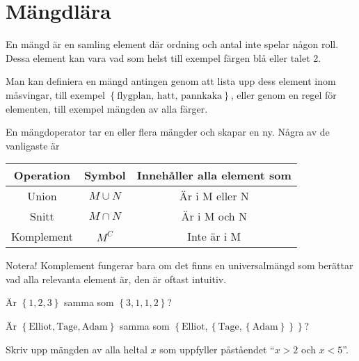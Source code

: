 \section{Mängdlära}

\begin{definition}[Mängd]
En mängd är en samling element där ordning och antal inte spelar någon roll. Dessa element kan vara vad som helst till exempel färgen blå eller talet 2.
\end{definition}

Man kan definiera en mängd antingen genom att lista upp dess element inom måsvingar, till exempel \(\left\{\text{flygplan, hatt, pannkaka} \right\}\), eller genom en regel för elementen, till exempel mängden av alla färger.

\begin{definition}[Mängdoperationer]
	En mängdoperator tar en eller flera mängder och skapar en ny. Några av de vanligaste är
	\begin{center}
		\begin{tabular}{|ccc|}
			\hline
			Operation & Symbol & Innehåller alla element som\\ \hline
			Union & \(M\cup N\) & Är i M eller N \\ \hline
			Snitt & \(M \cap  N\) & Är i M och N \\ \hline
			Komplement & \(M^C\) & Inte är i M \\ \hline
		\end{tabular}
	\end{center}
	Notera! Komplement fungerar bara om det finns en universalmängd som berättar vad alla relevanta element är, den är oftast intuitiv.
\end{definition}

\begin{problem}
	Är \(\left\{1, 2, 3\right\}\) samma som \(\left\{3, 1, 1, 2\right\}\)?
\end{problem}

\begin{problem}
	Är \(\left\{\text{Elliot} , \text{Tage}, \text{Adam} \right\}\) samma som \(\left\{\text{Elliot}, \left\{\text{Tage}, \left\{\text{Adam} \right\} \right\}\right\}\)?
\end{problem}

\begin{problem}
	Skriv upp mängden av alla heltal \(x\) som uppfyller påståendet ``\(x>2\) och \(x <5\)''.
\end{problem}


